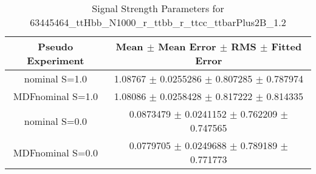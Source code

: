 \begin{table}
\centering
\caption{Signal Strength Parameters for 63445464\_ttHbb\_N1000\_r\_ttbb\_r\_ttcc\_ttbarPlus2B\_1.2}
\begin{tabular}{cc}
\toprule
Pseudo Experiment & Mean $\pm$ Mean Error $\pm$ RMS $\pm$ Fitted Error\\
\midrule
nominal S=1.0 & \num{1.08767} $\pm$ \num{0.0255286} $\pm$ \num{0.807285} $\pm$ \num{0.787974}\\
MDFnominal S=1.0 & \num{1.08086} $\pm$ \num{0.0258428} $\pm$ \num{0.817222} $\pm$ \num{0.814335}\\
nominal S=0.0 & \num{0.0873479} $\pm$ \num{0.0241152} $\pm$ \num{0.762209} $\pm$ \num{0.747565}\\
MDFnominal S=0.0 & \num{0.0779705} $\pm$ \num{0.0249688} $\pm$ \num{0.789189} $\pm$ \num{0.771773}\\
\bottomrule
\end{tabular}
\end{table}